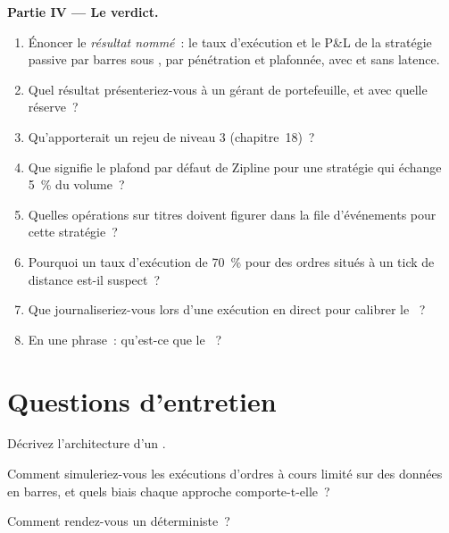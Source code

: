 \begin{problem}
\medskip\noindent\textbf{Partie IV --- Le verdict.}
\begin{enumerate}[resume]
\item Énoncer le \emph{résultat nommé}~: le taux d'exécution et le P\&L de la stratégie passive par barres sous , par pénétration et plafonnée, avec et sans
latence.
\item Quel résultat présenteriez-vous à un gérant de portefeuille, et avec quelle réserve~?
\item Qu'apporterait un rejeu de niveau 3 (chapitre~18)~?
\item Que signifie le plafond par défaut de Zipline pour une stratégie qui échange 5~\% du volume~?
\item Quelles opérations sur titres doivent figurer dans la file d'événements pour cette stratégie~?
\item Pourquoi un taux d'exécution de 70~\% pour des ordres situés à un tick de distance est-il suspect~?
\item Que journaliseriez-vous lors d'une exécution en direct pour calibrer le ~?
\item En une phrase~: qu'est-ce que le ~?
\end{enumerate}
\end{problem}

\section{Questions d'entretien}

\begin{interviewq}\label{iq:rs:event-driven-backtests:1}
Décrivez l'architecture d'un .
\end{interviewq}

\begin{interviewq}\label{iq:rs:event-driven-backtests:2}
Comment simuleriez-vous les exécutions d'ordres à cours limité sur des données en barres, et quels biais chaque approche comporte-t-elle~?
\end{interviewq}

\begin{interviewq}\label{iq:rs:event-driven-backtests:3}
Comment rendez-vous un  déterministe~?
\end{interviewq}

